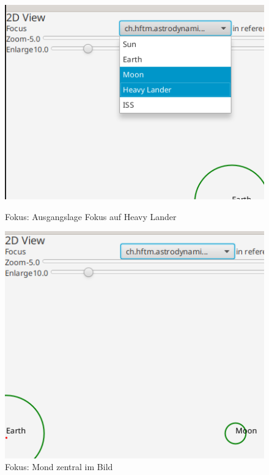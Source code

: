 \begin{figure}[H]
	\centering
	\begin{minipage}[b]{0.45\textwidth}
		\includegraphics[width=\textwidth]{res/viewfocus.png}
		\caption{Fokus: Ausgangslage Fokus auf Heavy Lander}
	\end{minipage}
	\hfill
	\begin{minipage}[b]{0.45\textwidth}
		\includegraphics[width=\textwidth]{res/viewfocus2.png}
		\caption{Fokus: Mond zentral im Bild}
	\end{minipage}
\end{figure}


